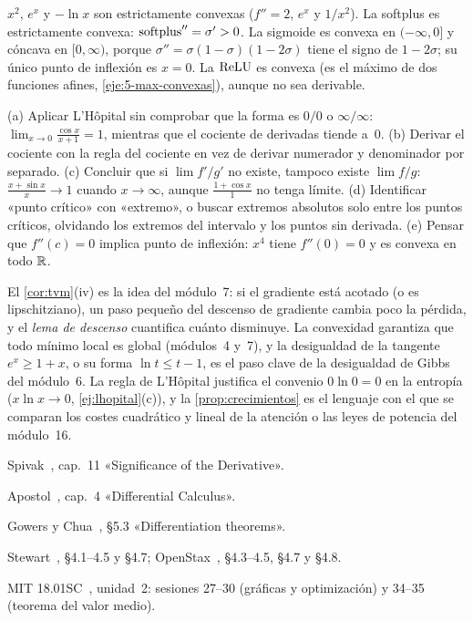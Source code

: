 \begin{ejemplo}\label{ej:convexas}
$x^{2}$, $e^{x}$ y $-\ln x$ son estrictamente convexas ($f''=2$, $e^{x}$ y $1/x^{2}$). La softplus es estrictamente convexa: $\operatorname{softplus}''=\sigma'>0$. La sigmoide es convexa en $(-\infty,0]$ y cóncava en $[0,\infty)$, porque $\sigma''=\sigma(1-\sigma)(1-2\sigma)$ tiene el signo de $1-2\sigma$; su único punto de inflexión es $x=0$. La $\operatorname{ReLU}$ es convexa (es el máximo de dos funciones afines, \cref{eje:5-max-convexas}), aunque no sea derivable.
\end{ejemplo}

\begin{observacion}\label{obs:5-errores}
(a) Aplicar L'Hôpital sin comprobar que la forma es $0/0$ o $\infty/\infty$: $\lim_{x\to0}\frac{\cos x}{x+1}=1$, mientras que el cociente de derivadas tiende a~$0$.
(b) Derivar el cociente con la regla del cociente en vez de derivar numerador y denominador por separado.
(c) Concluir que si $\lim f'/g'$ no existe, tampoco existe $\lim f/g$: $\frac{x+\sin x}{x}\to1$ cuando $x\to\infty$, aunque $\frac{1+\cos x}{1}$ no tenga límite.
(d) Identificar «punto crítico» con «extremo», o buscar extremos absolutos solo entre los puntos críticos, olvidando los extremos del intervalo y los puntos sin derivada.
(e) Pensar que $f''(c)=0$ implica punto de inflexión: $x^{4}$ tiene $f''(0)=0$ y es convexa en todo $\mathbb{R}$.
\end{observacion}

\begin{observacion}
El \cref{cor:tvm}(iv) es la idea del módulo~7: si el gradiente está acotado (o es lipschitziano), un paso pequeño del descenso de gradiente cambia poco la pérdida, y el \emph{lema de descenso} cuantifica cuánto disminuye. La convexidad garantiza que todo mínimo local es global (módulos~4 y~7), y la desigualdad de la tangente $e^{x}\ge1+x$, o su forma $\ln t\le t-1$, es el paso clave de la desigualdad de Gibbs del módulo~6. La regla de L'Hôpital justifica el convenio $0\ln0=0$ en la entropía ($x\ln x\to0$, \cref{ej:lhopital}(c)), y la \cref{prop:crecimientos} es el lenguaje con el que se comparan los costes cuadrático y lineal de la atención o las leyes de potencia del módulo~16.
\end{observacion}

\begin{lecturas}
\item Spivak~\cite{spivak}, cap.~11 «Significance of the Derivative».
\item Apostol~\cite{apostol}, cap.~4 «Differential Calculus».
\item Gowers y Chua~\cite{cambA1}, §5.3 «Differentiation theorems».
\item Stewart~\cite{stewart}, §4.1--4.5 y §4.7; OpenStax~\cite{osc1}, §4.3--4.5, §4.7 y §4.8.
\item MIT 18.01SC~\cite{mit1801}, unidad~2: sesiones 27--30 (gráficas y optimización) y 34--35 (teorema del valor medio).
\end{lecturas}

